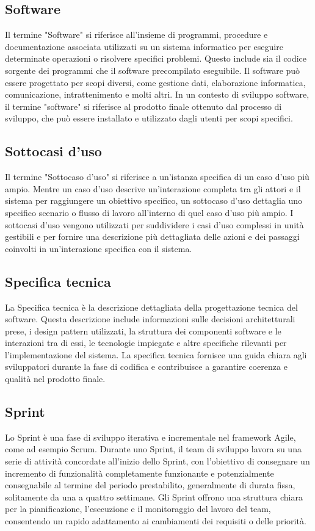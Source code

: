 \subsection{Software} 
Il termine "Software" si riferisce all'insieme di programmi, procedure e documentazione associata utilizzati su un sistema informatico per eseguire determinate operazioni o risolvere specifici problemi. Questo include sia il codice sorgente dei programmi che il software precompilato eseguibile. Il software può essere progettato per scopi diversi, come gestione dati, elaborazione informatica, comunicazione, intrattenimento e molti altri. In un contesto di sviluppo software, il termine "software" si riferisce al prodotto finale ottenuto dal processo di sviluppo, che può essere installato e utilizzato dagli utenti per scopi specifici. 
\subsection{Sottocasi d'uso} 
Il termine "Sottocaso d'uso" si riferisce a un'istanza specifica di un caso d'uso più ampio. Mentre un caso d'uso descrive un'interazione completa tra gli attori e il sistema per raggiungere un obiettivo specifico, un sottocaso d'uso dettaglia uno specifico scenario o flusso di lavoro all'interno di quel caso d'uso più ampio. I sottocasi d'uso vengono utilizzati per suddividere i casi d'uso complessi in unità gestibili e per fornire una descrizione più dettagliata delle azioni e dei passaggi coinvolti in un'interazione specifica con il sistema. 
\subsection{Specifica tecnica} 
La Specifica tecnica è la descrizione dettagliata della progettazione tecnica del software. Questa descrizione include informazioni sulle decisioni architetturali prese, i design pattern utilizzati, la struttura dei componenti software e le interazioni tra di essi, le tecnologie impiegate e altre specifiche rilevanti per l'implementazione del sistema. La specifica tecnica fornisce una guida chiara agli sviluppatori durante la fase di codifica e contribuisce a garantire coerenza e qualità nel prodotto finale. 
\subsection{Sprint} 
Lo Sprint è una fase di sviluppo iterativa e incrementale nel framework Agile, come ad esempio Scrum. Durante uno Sprint, il team di sviluppo lavora su una serie di attività concordate all'inizio dello Sprint, con l'obiettivo di consegnare un incremento di funzionalità completamente funzionante e potenzialmente consegnabile al termine del periodo prestabilito, generalmente di durata fissa, solitamente da una a quattro settimane. Gli Sprint offrono una struttura chiara per la pianificazione, l'esecuzione e il monitoraggio del lavoro del team, consentendo un rapido adattamento ai cambiamenti dei requisiti o delle priorità. 
